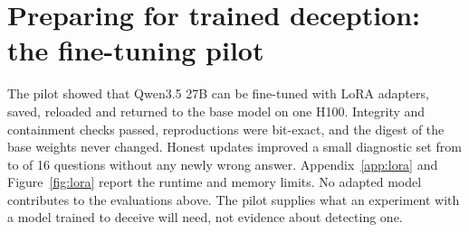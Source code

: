 \section{Preparing for trained deception: the fine-tuning pilot}
\label{sec:lora}

The pilot showed that Qwen3.5 27B can be fine-tuned with LoRA adapters, saved, reloaded and returned to the base model on one H100. Integrity and containment checks passed, reproductions were bit-exact, and the digest of the base weights never changed. Honest updates improved a small diagnostic set from  to  of 16 questions without any newly wrong answer. Appendix~\ref{app:lora} and Figure~\ref{fig:lora} report the runtime and memory limits. No adapted model contributes to the evaluations above. The pilot supplies what an experiment with a model trained to deceive will need, not evidence about detecting one.
